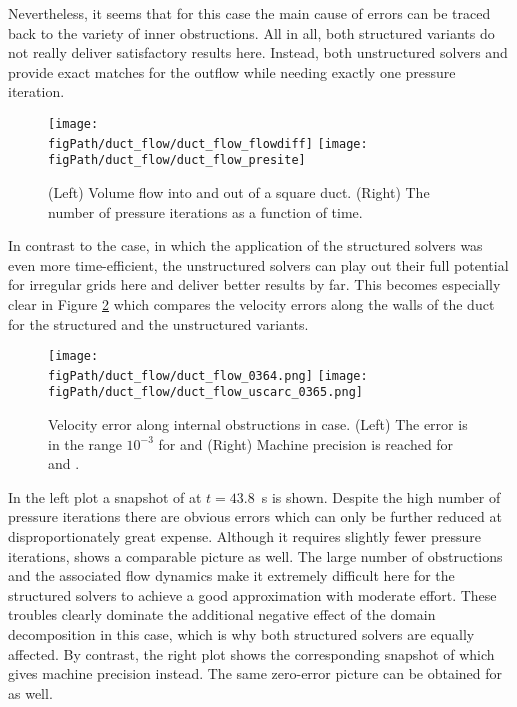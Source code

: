 Nevertheless, it seems that for this case the main cause of errors can be traced back to the variety of inner obstructions. 
All in all, both structured variants do not really deliver satisfactory results here.
Instead, both unstructured solvers \uglmat{} and \uscarc{} provide exact matches for the outflow while needing exactly one pressure iteration.

\begin{figure}[ht]
\begin{center}
\texttt{[image: \\figPath/duct\_flow/duct\_flow\_flowdiff]}
\texttt{[image: \\figPath/duct\_flow/duct\_flow\_presite]}
\end{center}
\caption[Results of the {} test case]{(Left) Volume flow into and out of a square duct. (Right) The number of pressure iterations as a function of time.}
\label{FIG_scarc_duct_flow_volumeflow}
\end{figure}

In contrast to the {} case, in which the application of the structured solvers was even more time-efficient, the unstructured solvers can play out their full potential for irregular grids here and deliver better results by far. 
This becomes especially clear in Figure \ref{FIG_scarc_duct_flow_velerror} which compares the 
velocity errors along the walls of the duct for the structured and the unstructured variants. 

\begin{figure}[ht]
\begin{center}
\texttt{[image: \\figPath/duct\_flow/duct\_flow\_0364.png]}
\texttt{[image: \\figPath/duct\_flow/duct\_flow\_uscarc\_0365.png]}
\end{center}
\caption[Velocity error along internal obstructions in {} case]{Velocity error along internal obstructions in {} case. (Left) The error is in the range $10^{-3}$ for  \ffttight{} and \scarctight{} (Right) Machine precision is reached for \uglmat{} and \uscarc{}. }
\label{FIG_scarc_duct_flow_velerror}
\end{figure}

In the left plot a snapshot of \ffttight{} at $t=43.8$~s is shown. Despite the high number of pressure iterations there are obvious errors which can only be further reduced at disproportionately great expense. Although it requires slightly fewer pressure iterations, \scarctight{} shows a comparable picture as well.
The large number of obstructions and the associated flow dynamics make it extremely difficult here for the structured solvers to achieve a good approximation with moderate effort.
These troubles clearly dominate the additional negative effect of the domain decomposition in this case, which is why both structured solvers are equally affected.
By contrast, the right plot shows the corresponding snapshot of \uscarc{} which gives machine precision instead. The same zero-error picture can be obtained for \uglmat{} as well.


